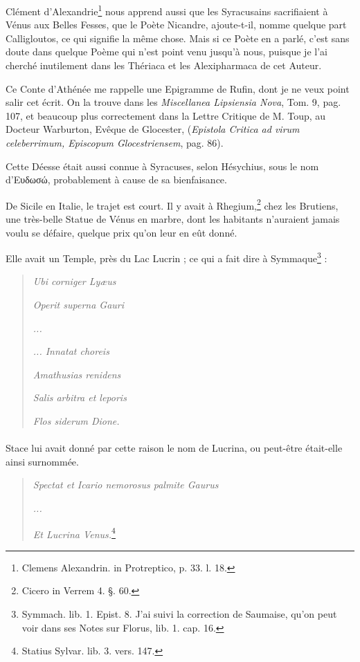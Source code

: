 \documentclass[a4paper, 18pt, oneside]{article}
\begin{document}
Clément d'Alexandrie\footnote{Clemens Alexandrin. in Protreptico, p. 33. l. 18.} nous apprend aussi que les Syracusains sacrifiaient à Vénus aux Belles Fesses, que le Poète Nicandre, ajoute-t-il, nomme quelque part Calligloutos, ce qui signifie la même chose. Mais si ce Poète en a parlé, c'est sans doute dans quelque Poème qui n'est point venu jusqu'à nous, puisque je l'ai cherché inutilement dans les Thériaca et les Alexipharmaca de cet Auteur.

Ce Conte d'Athénée me rappelle une Epigramme de Rufin, dont je ne veux point salir cet écrit. On la trouve dans les \emph{Miscellanea Lipsiensia Nova}, Tom. 9, pag. 107, et beaucoup plus correctement dans la Lettre Critique de M. Toup, au Docteur Warburton, Evêque de Glocester, (\emph{Epistola Critica ad virum celeberrimum, Episcopum Glocestriensem}, pag. 86).

Cette Déesse était aussi connue à Syracuses, selon Hésychius, sous le nom d'Ευδωσώ, probablement à cause de sa bienfaisance.

De Sicile en Italie, le trajet est court. Il y avait à Rhegium,\footnote{Cicero in Verrem 4. §. 60.} chez les Brutiens, une très-belle Statue de Vénus en marbre, dont les habitants n'auraient jamais voulu se défaire, quelque prix qu'on leur en eût donné.

Elle avait un Temple, près du Lac Lucrin ; ce qui a fait dire à Symmaque\footnote{Symmach. lib. 1. Epist. 8. J'ai suivi la correction de Saumaise, qu'on peut voir dans ses Notes sur Florus, lib. 1. cap. 16.} :
\begin{quotation}
\emph{Ubi corniger Lyæus}

\emph{Operit superna Gauri}

\emph{...}

\emph{... Innatat choreis}

\emph{Amathusias renidens}

\emph{Salis arbitra et leporis}

\emph{Flos siderum Dione.}
\end{quotation}
\paragraph{}
Stace lui avait donné par cette raison le nom de Lucrina, ou peut-être était-elle ainsi surnommée.
\begin{quotation}
\emph{Spectat et Icario nemorosus palmite Gaurus}

\emph{...}

\emph{Et Lucrina Venus.}\footnote{Statius Sylvar. lib. 3. vers. 147.}
\end{quotation}
\end{document}

